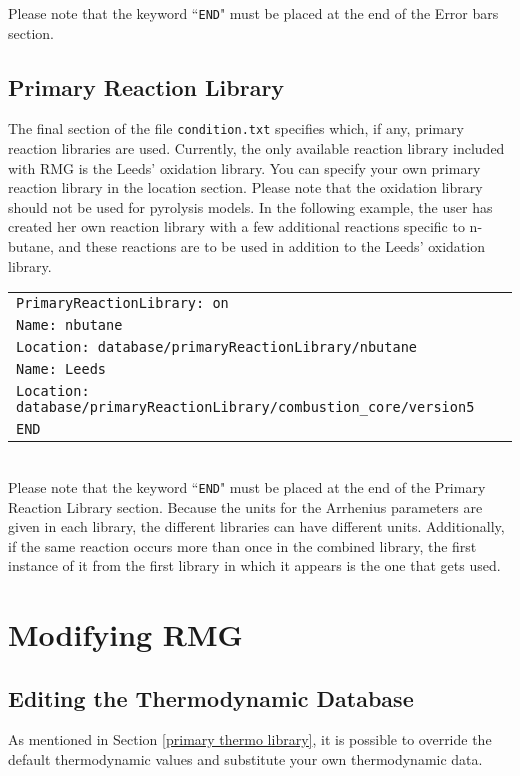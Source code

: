 \documentclass[12pt,letterpaper]{article}
\begin{document}
Please note that the keyword ``\texttt{END}" must be placed at the end of the
Error bars section.

\subsection{Primary Reaction Library}

The final section of the file \texttt{condition.txt} specifies which, if any, primary reaction
libraries are used. Currently, the only available reaction library included
with RMG is the Leeds' oxidation library. You can specify your own primary
reaction library in the location section. Please note that the oxidation library
should not be used for pyrolysis models. In the following example, the user
has created her own reaction library with a few additional reactions specific
to n-butane, and these reactions are to be used in addition to the Leeds'
oxidation library.\\

\begin{tabular}{l}
\texttt{PrimaryReactionLibrary: on}\\
\texttt{Name: nbutane}\\
\texttt{Location: database/primaryReactionLibrary/nbutane}\\
\texttt{Name: Leeds}\\
\texttt{Location: database/primaryReactionLibrary/combustion\_core/version5}\\
\texttt{END}
\end{tabular}\\


Please note that the keyword ``\texttt{END}" must be placed at the end of the
Primary Reaction Library section. Because the units for the Arrhenius parameters
are given in each library, the different libraries can have different units.
Additionally, if the same reaction occurs more than once in the combined
library, the first instance of it from the first library in which it appears is the
one that gets used.

\section{Modifying RMG}
\subsection{Editing the Thermodynamic Database}\label{editing thermo database}
As mentioned in Section \ref{primary thermo library}, it is possible to override the default thermodynamic
values and substitute your own thermodynamic data.
\end{document}
